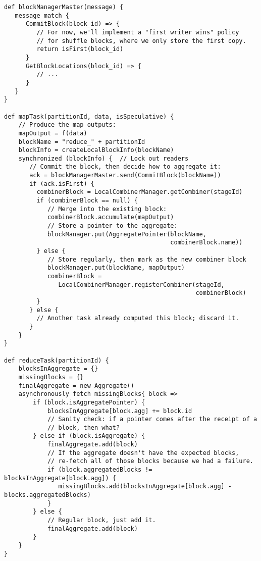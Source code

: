 \documentclass[12pt]{article}
\begin{document}
\begin{verbatim}
def blockManagerMaster(message) {
   message match {
      CommitBlock(block_id) => {
         // For now, we'll implement a "first writer wins" policy
         // for shuffle blocks, where we only store the first copy.
         return isFirst(block_id)
      }
      GetBlockLocations(block_id) => {
         // ...
      }
   }
}

def mapTask(partitionId, data, isSpeculative) {
    // Produce the map outputs:
    mapOutput = f(data)
    blockName = "reduce_" + partitionId
    blockInfo = createLocalBlockInfo(blockName)
    synchronized (blockInfo) {  // Lock out readers
       // Commit the block, then decide how to aggregate it:
       ack = blockManagerMaster.send(CommitBlock(blockName))
       if (ack.isFirst) {
         combinerBlock = LocalCombinerManager.getCombiner(stageId)
         if (combinerBlock == null) {
            // Merge into the existing block:
            combinerBlock.accumulate(mapOutput)
            // Store a pointer to the aggregate:
            blockManager.put(AggregatePointer(blockName,
                                              combinerBlock.name))
         } else {
            // Store regularly, then mark as the new combiner block
            blockManager.put(blockName, mapOutput)
            combinerBlock =
               LocalCombinerManager.registerCombiner(stageId,
                                                     combinerBlock)
         }
       } else {
         // Another task already computed this block; discard it.
       }
    }
}

def reduceTask(partitionId) {
    blocksInAggregate = {}
    missingBlocks = {}
    finalAggregate = new Aggregate()
    asynchronously fetch missingBlocks{ block =>
        if (block.isAggregatePointer) {
            blocksInAggregate[block.agg] += block.id    
            // Sanity check: if a pointer comes after the receipt of a
            // block, then what?  
        } else if (block.isAggregate) {
            finalAggregate.add(block)
            // If the aggregate doesn't have the expected blocks,
            // re-fetch all of those blocks because we had a failure.
            if (block.aggregatedBlocks != blocksInAggregate[block.agg]) {
               missingBlocks.add(blocksInAggregate[block.agg] - blocks.aggregatedBlocks)
            }
        } else {
            // Regular block, just add it.
            finalAggregate.add(block)
        }
    }
}    
\end{verbatim}
\end{document}
